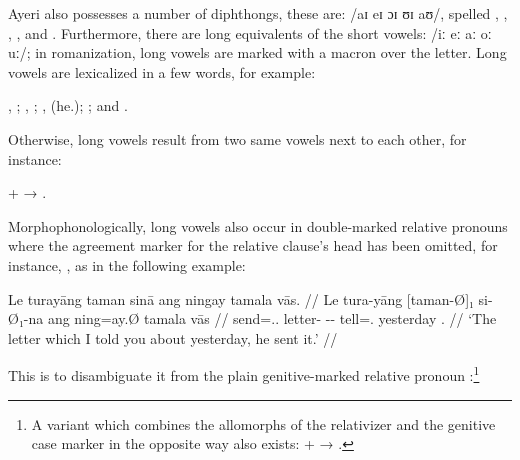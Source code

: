 Ayeri also possesses a number of diphthongs, these are: 
/aɪ eɪ ɔɪ ʊɪ aʊ/, spelled , , , , and 
. Furthermore, there are long equivalents of the short vowels: /iː eː 
aː oː uː/; in romanization, long vowels are marked with a macron 
 over the letter. Long vowels are lexicalized in a few words, for 
example:

\pex
	\a {}, 
		;
	\a {}, 
		;
	\a {},
		 (he.\Aarg{});\label{ex:laa}
	\a {}; and 
	\a {}.\footnotemark
\xe


Otherwise, long vowels result from two same vowels next to each other, for 
instance:

\ex
	 +  → 
	.\label{ex:longvwls}
\xe

\label{doublerel}
Morphophonologically, long vowels also occur in double-marked relative 
pronouns where the agreement 
marker for the relative clause's head has been omitted, for instance, 
, as in the following 
example:

\ex\begingl
	\gla Le turayāng taman sinā ang ningay tamala vās. //
	\glb Le tura-yāng [taman-Ø]₁ si-Ø₁-na ang ning=ay.Ø 
		tamala vās //
	\glc \PatTI{} send=\Tsg{}.\M{}.\Aarg{} letter-\Top{} 
		\Rel{}-\PatTI{}-\Gen{} \AgtT{} tell=\Fsg{}.\Top{} yesterday 
		\Ssg{}.\Parg{} //
	\glft `The letter which I told you about yesterday, he sent it.' //
\endgl\xe

\noindent This is to disambiguate it from the plain genitive-marked relative 
pronoun :\footnote{A variant which combines the 
allomorphs of the relativizer and the genitive case marker in the opposite way 
also exists:  +  → .}

